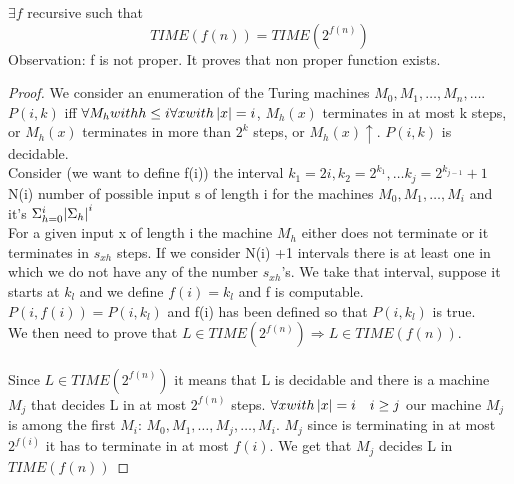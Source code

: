 \begin{theorem}
    $\exists f$ recursive such that 
    \[ 
        TIME(f(n)) = TIME(2^{f(n)}) 
    \]Observation: f is not proper. It proves that non proper function exists.\\
    \begin{proof}
        We consider an enumeration of the Turing machines $M_{0},M_{1}, \ldots,M_{n},\ldots$.\\
        $P(i,k)$ iff $\forall M_h with h\leq i \forall x with \left\lvert x\right\rvert=i$, $M_h(x)$ terminates in at most k steps, or $M_h(x)$ terminates in more than $2^k$ steps, or $M_h(x) \uparrow$. $P(i,k)$ is decidable.\\
        Consider (we want to define f(i)) the interval $k_1 = 2i, k_2 = 2^{k_1}, \ldots k_j = 2^{k_{j-1}}+1$
        N(i) number of possible input s of length i for the machines $M_0, M_1, \ldots, M_i$ and it's $\Sigma_{h=0}^{i}{\left\lvert\Sigma_h\right\rvert^i}$\\
        For a given input x of length i the machine $M_h$ either does not terminate or it terminates in $s_{xh}$ steps. If we consider N(i) +1 intervals there is at least one in which we do not have any of the number $s_{xh}$'s. We take that interval, suppose it starts at $k_l$ and we define $f(i)=k_l$ and f is computable. $P(i,f(i))= P(i,k_l)$ and f(i) has been defined so that $P(i,k_l)$ is true.\\
        We then need to prove that $L \in TIME(2^{f(n)}) \Rightarrow L \in TIME(f(n))$.\\\\
        Since $L\in TIME(2^{f(n)})$ it means that L is decidable and there is a machine $M_j$ that decides L in at most $2^{f(n)}$ steps. $\forall x with \left\lvert x\right\rvert= i \quad i\geq j$ our machine $M_j$ is among the first $M_i$: $M_0, M_1, \ldots, M_j, \ldots, M_i$. $M_j$ since is terminating in at most $2^{f(i)}$ it has to terminate in at most $f(i)$. We get that $M_j$ decides L in $TIME(f(n))$
    \end{proof}
\end{theorem}
